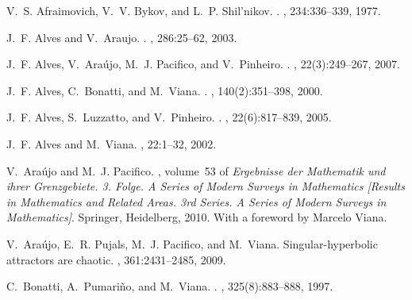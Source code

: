 \documentclass[reqno,12pt,a4paper]{amsart}
\theoremstyle{plain}
\theoremstyle{definition}
\begin{document}
\begin{thebibliography}{10}

V.~S. Afraimovich, V.~V. Bykov, and L.~P. Shil{'}nikov.
.
, {234}:{336--339}, {1977}.

J.~F. Alves and V.~Araujo.
.
, {286}:{25--62}, {2003}.

J.~F. Alves, V.~Ara{\'u}jo, M.~J. Pacifico, and V.~Pinheiro.
.
,
  {22}({3}):{249--267}, {2007}.

J.~F. Alves, C.~Bonatti, and M.~Viana.
.
, {140}({2}):{351--398}, {2000}.

J.~F. Alves, S.~Luzzatto, and V.~Pinheiro.
.
,
  {22}({6}):{817--839}, {2005}.

J.~F. Alves and M.~Viana.
, {22}:{1--32}, {2002}.

V.~Ara{\'u}jo and M.~J. Pacifico.
, volume~53 of {\em Ergebnisse der
  Mathematik und ihrer Grenzgebiete. 3. Folge. A Series of Modern Surveys in
  Mathematics [Results in Mathematics and Related Areas. 3rd Series. A Series
  of Modern Surveys in Mathematics]}.
\newblock Springer, Heidelberg, 2010.
\newblock With a foreword by Marcelo Viana.

V.~Ara{\'u}jo, E.~R. Pujals, M.~J. Pacifico, and M.~Viana.
\newblock Singular-hyperbolic attractors are chaotic.
, 361:2431--2485, 2009.

C.~Bonatti, A.~Pumari{\~n}o, and M.~Viana.
.
,
  {325}({8}):{883--888}, {1997}.


\end{thebibliography}
\end{document}
